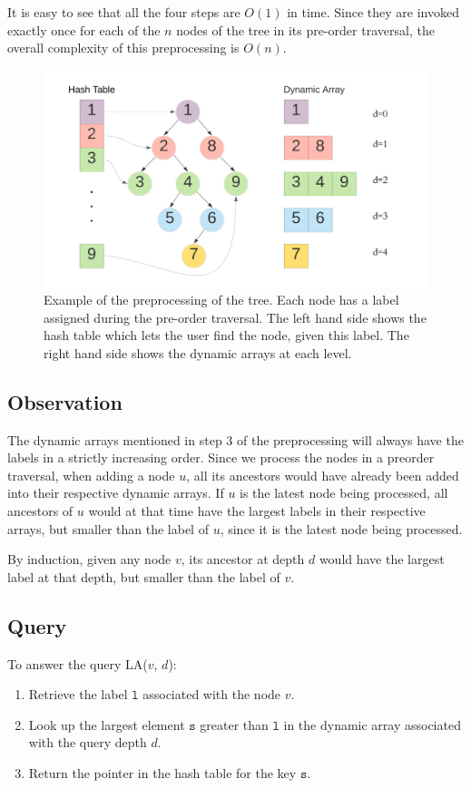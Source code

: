 \documentclass[10pt]{article}
\begin{document}
It is easy to see that all the four steps are $O(1)$ in time. Since they are invoked exactly once for each of the $n$ nodes of the tree in its pre-order traversal, the overall complexity of this preprocessing is $O(n)$.

\begin{figure}[t]
\includegraphics[scale=0.125]{level_ancestor.png}
\centering
\caption{Example of the preprocessing of the tree. Each node has a label assigned during the pre-order traversal. The left hand side shows the hash table which lets the user find the node, given this label. The right hand side shows the dynamic arrays at each level.}
\end{figure}

\subsection{Observation}
The dynamic arrays mentioned in step 3 of the preprocessing will always have the labels in a strictly increasing order. Since we process the nodes in a preorder traversal, when adding a node $u$, all its ancestors would have already been added into their respective dynamic arrays. If $u$ is the latest node being processed, all ancestors of $u$ would at that time have the largest labels in their respective arrays, but smaller than the label of $u$, since it is the latest node being processed.

By induction, given any node $v$, its ancestor at depth $d$ would have the largest label at that depth, but smaller than the label of $v$.

\subsection{Query}

To answer the query LA($v$, $d$):
\begin{enumerate}
    \item Retrieve the label $\mathtt{l}$ associated with the node $v$.
    \item Look up the largest element $\mathtt{s}$ greater than $\mathtt{l}$ in the dynamic array associated with the query depth $d$.
    \item Return the pointer in the hash table for the key $\mathtt{s}$.
\end{enumerate}
\end{document}
